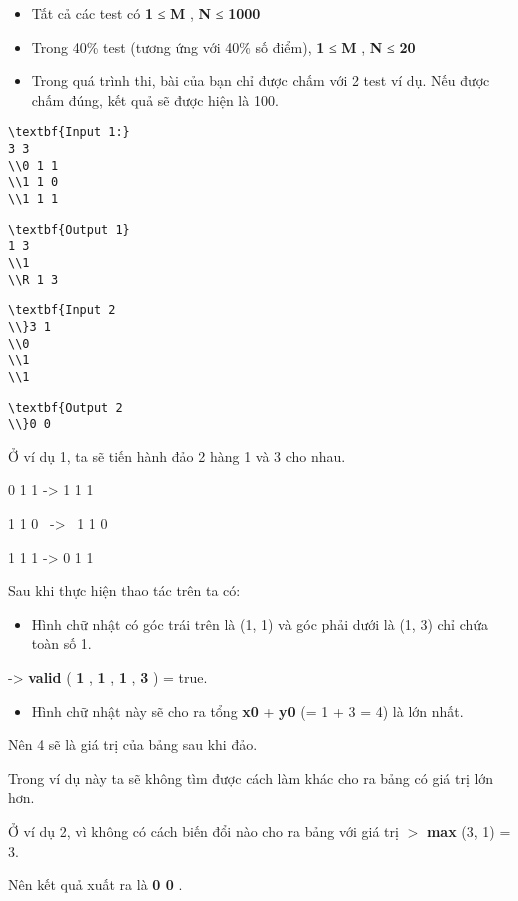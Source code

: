 \begin{itemize}
	\item     Tất cả các test có    \textbf{     1    }    ≤    \textbf{     M    }    ,    \textbf{     N    }    ≤    \textbf{     1000    }
	\item     Trong 40\% test (tương ứng với 40\% số điểm),    \textbf{     1    }    ≤    \textbf{     M    }    ,    \textbf{     N    }    ≤    \textbf{     20    }
	\item      Trong quá trình thi, bài của bạn chỉ được chấm với 2 test ví dụ. Nếu được chấm đúng, kết quả sẽ được hiện là 100.    
\end{itemize}
\begin{verbatim}
\textbf{Input 1:}
3 3
\\0 1 1
\\1 1 0
\\1 1 1
\end{verbatim}
\begin{verbatim}
\textbf{Output 1}
1 3
\\1
\\R 1 3
\end{verbatim}
\begin{verbatim}
\textbf{Input 2
\\}3 1
\\0
\\1
\\1\end{verbatim}
\begin{verbatim}
\textbf{Output 2
\\}0 0\end{verbatim}
Ở ví dụ 1, ta sẽ tiến hành đảo 2 hàng 1 và 3 cho nhau.  

    0 1 1      ->   1 1 1

   1 1 0  ->  1 1 0  

1 1 1   ->       0 1 1   

   Sau khi thực hiện thao tác trên ta có:  
\begin{itemize}
	\item     Hình chữ nhật có góc trái trên là (1, 1) và góc phải dưới là (1, 3) chỉ chứa toàn số 1.   
\end{itemize}

   ->   \textbf{    valid   }   (   \textbf{    1   }   ,   \textbf{    1   }   ,   \textbf{    1   }   ,   \textbf{    3   }   ) = true.  
\begin{itemize}
	\item     Hình chữ nhật này sẽ cho ra tổng    \textbf{     x0    }    +    \textbf{     y0    }    (= 1 + 3 = 4) là lớn nhất.   
\end{itemize}

   Nên 4 sẽ là giá trị của bảng sau khi đảo.  

   Trong ví dụ này ta sẽ không tìm được cách làm khác cho ra bảng có giá trị lớn hơn.  

   Ở ví dụ 2, vì không có cách biến đổi nào cho ra bảng với giá trị   \textbf{}\textbf{    $>$   }\textbf{    max   }   (3, 1) = 3.  

   Nên kết quả xuất ra là   \textbf{    0 0   }   .